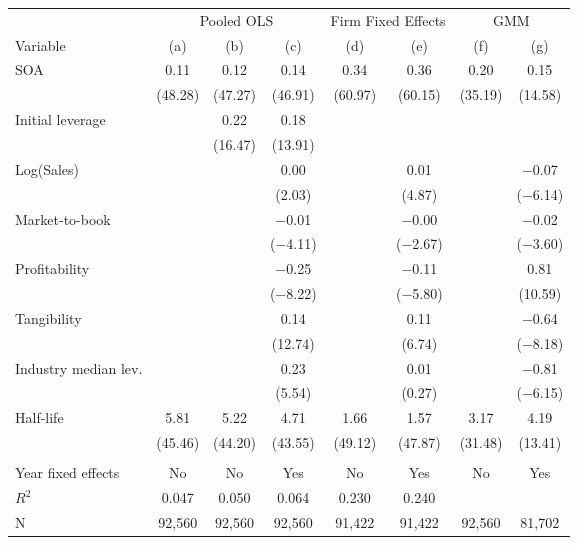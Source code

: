 \begin{tabular}{l*{7}{c}}
\toprule
 & \multicolumn{3}{c}{Pooled OLS} & \multicolumn{2}{c}{Firm Fixed Effects} & \multicolumn{2}{c}{GMM} \\ \cmidrule(lr){2-4} \cmidrule(lr){5-6} \cmidrule(lr){7-8}
Variable & (a) & (b) & (c) & (d) & (e) & (f) & (g) \\ \midrule
SOA         &        0.11&        0.12&        0.14&        0.34&        0.36&        0.20&        0.15\\
            &     (48.28)&     (47.27)&     (46.91)&     (60.97)&     (60.15)&     (35.19)&     (14.58)\\
\addlinespace
Initial leverage&            &        0.22&        0.18&            &            &            &            \\
            &            &     (16.47)&     (13.91)&            &            &            &            \\
\addlinespace
Log(Sales)  &            &            &        0.00&            &        0.01&            &     $-$0.07\\
            &            &            &      (2.03)&            &      (4.87)&            &   ($-$6.14)\\
\addlinespace
Market-to-book&            &            &     $-$0.01&            &     $-$0.00&            &     $-$0.02\\
            &            &            &   ($-$4.11)&            &   ($-$2.67)&            &   ($-$3.60)\\
\addlinespace
Profitability&            &            &     $-$0.25&            &     $-$0.11&            &        0.81\\
            &            &            &   ($-$8.22)&            &   ($-$5.80)&            &     (10.59)\\
\addlinespace
Tangibility &            &            &        0.14&            &        0.11&            &     $-$0.64\\
            &            &            &     (12.74)&            &      (6.74)&            &   ($-$8.18)\\
\addlinespace
Industry median lev.&            &            &        0.23&            &        0.01&            &     $-$0.81\\
            &            &            &      (5.54)&            &      (0.27)&            &   ($-$6.15)\\
\addlinespace
Half-life   &        5.81&        5.22&        4.71&        1.66&        1.57&        3.17&        4.19\\
            &     (45.46)&     (44.20)&     (43.55)&     (49.12)&     (47.87)&     (31.48)&     (13.41)\\
\\
Year fixed effects&          No&          No&         Yes&          No&         Yes&          No&         Yes\\
$ R^{2}$    &       0.047&       0.050&       0.064&       0.230&       0.240&            &            \\
N           &      92,560&      92,560&      92,560&      91,422&      91,422&      92,560&      81,702\\
\bottomrule
\end{tabular}
